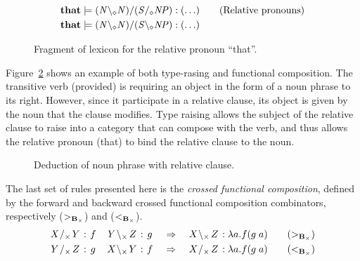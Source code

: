 \begin{figure}[ht]
\begin{align*}
  \mathbf{that}       &\models ({\mathit{N}} \backslash_\diamond {\mathit{N}})/({\mathit{S}}/_\diamond{\mathit{NP}})    : (\ldots)    \tag{Relative pronouns}   \\
  \mathbf{that}       &\models ({\mathit{N}} \backslash_\diamond {\mathit{N}})/({\mathit{S}}\backslash_\diamond{\mathit{NP}})    : (\ldots)    
\end{align*}
\caption{Fragment of lexicon for the relative pronoun ``that''.}
\label{fig:tinyLex2}
\end{figure}


\begin{example}
Figure~\ref{fig:relativeClause} shows an example of both type-rasing and functional composition. The transitive verb (provided) is requiring an object in the form of a noun phrase to its right. However, since it participate in a relative clause, its object is given by the noun that the clause modifies. Type raising allows the subject of the relative clause to raise into a category that can compose with the verb, and thus allows the relative pronoun (that) to bind the relative clause to the noun.
\vfill
\begin{figure}[ht]
\center
{}
\caption{Deduction of noun phrase with relative clause.}
\label{fig:relativeClause}
\end{figure}
\vfill
\label{ex:relativeClause}
\end{example}
\done

The last set of rules presented here is the \emph{crossed functional composition}, defined by the forward and backward crossed functional composition combinators, respectively (${>_{{\bf B}_\times}}$) and (${<_{{\bf B}_\times}}$).
\begin{align*}
  \catvar{X} /_\times \catvar{Y} : \fvar{f} \quad \catvar{Y} \bsl_\times \catvar{Z} : \fvar{g} 
  &\quad\Rightarrow\quad
  \catvar{X} \bsl_\times \catvar{Z} : \lambda a . f ( g \; a)
  \tag{${>_{\bf{B}_\times}}$} \\
  \catvar{Y}   /_\times  \catvar{Z} : \fvar{g} \quad \catvar{X}  \bsl_\times   \catvar{Y} : \fvar{f}
  &\quad\Rightarrow\quad
  \catvar{X}   /_\times  \catvar{Z} : \lambda a . f ( g \; a)
  \tag{${<_{\bf{B}_\times}}$}
\end{align*}

